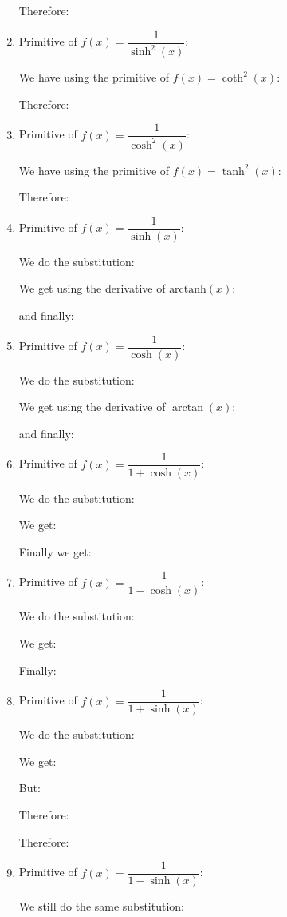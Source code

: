 \begin{enumerate}
		Therefore:
		
		
		\item Primitive of $f(x)=\dfrac{1}{\sinh^2(x)}$:
		
		We have using the primitive of $f(x)=\coth^2(x)$:
		
		Therefore:
		
		
		\item Primitive of $f(x)=\dfrac{1}{\cosh^2(x)}$:
		
		We have using the primitive of $f(x)=\tanh^2(x)$:
		
		Therefore:
		
		
		\item Primitive of $f(x)=\dfrac{1}{\sinh(x)}$:
		
		We do the substitution:
		
		We get using the derivative of $\text{arctanh}(x)$:
		
		
		and finally:
		
		
		\item Primitive of $f(x)=\dfrac{1}{\cosh(x)}$:
		
		We do the substitution:
		
		We get using the derivative of $\arctan(x)$:
		
		and finally:
		
		\item Primitive of $f(x)=\dfrac{1}{1+\cosh(x)}$:
		
		We do the substitution:
		
		We get:
		
		Finally we get:
		
		
		\item Primitive of $f(x)=\dfrac{1}{1-\cosh(x)}$:
		
		We do the substitution:
		
		We get:
		
		Finally:
		
		
		\item Primitive of $f(x)=\dfrac{1}{1+\sinh(x)}$:
		
		We do the substitution:
		
		We get:
		
		But:
		
		Therefore:
		
		Therefore:
		
		
		\item Primitive of $f(x)=\dfrac{1}{1-\sinh(x)}$:
		
		We still do the same substitution:
		

\end{enumerate}
